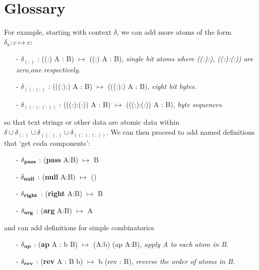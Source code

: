 \documentclass[11pt]{article}
\begin{document}
\section{Glossary}

For example, starting with context $\delta$, we can add more atoms of the form $\delta_a:c\mapsto c$:
\begin{enumerate}
\item[-]{$\delta_{(:)}$ : ((:) A : B) $\mapsto$ ((:) A : B), {\it single bit atoms where ((:):), ((:):(:)) are zero,one respectively.}}
\item[-]{$\delta_{((:):)}$ : (((:):) A : B) $\mapsto$ (((:):) A : B), {\it eight bit bytes.}}
\item[-]{$\delta_{((:):(:))}$ : (((:):(:)) A : B) $\mapsto$ (((:):(:)) A : B), {\it byte sequences}.}
\end{enumerate}
so that text strings or other data are atomic data within $\delta\cup\delta_{(:)}\cup\delta_{((:):)}\cup\delta_{((:):(:))}$.  We can then proceed to add named 
definitions that `get coda components':
\begin{enumerate}
\item[-]{$\delta_{\bf pass}$ : ({\bf pass} A:B) $\mapsto$ B}
\item[-]{$\delta_{\bf null}$ : ({\bf null} A:B) $\mapsto$ ()}
\item[-]{$\delta_{\bf right}$ : ({\bf right} A:B) $\mapsto$ B} 
\item[-]{$\delta_{\bf arg}$ : ({\bf arg} A:B) $\mapsto$ A} 
\end{enumerate}
and can add definitions for simple combinatorics 
\begin{enumerate}
\item[-]{$\delta_{\bf ap}$ : ({\bf ap} A : b B) $\mapsto$ (A:b) (ap A:B), {\it apply A to each atom in B.}}
\item[-]{$\delta_{\bf rev}$ : ({\bf rev} A : B b) $\mapsto$ b (rev : B), {\it reverse the order of atoms in B.}}
\end{enumerate}
\end{document}
